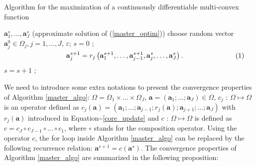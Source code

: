 \documentclass[
]{jss}
\begin{document}
\begin{algorithm}[!ht]
    \caption{Algorithm for the maximization of a continuously differentiable multi-convex function}
    \begin{algorithmic}[1]
         {$\mathbf a_1^s, \ldots,  \mathbf a_J^s$ (approximate solution of (\ref{master_optim}))}
         {choose random vector $\mathbf a_j^0\in\Omega_j, j =1, \ldots, J$, $\varepsilon$;}
        \STATE$s = 0$ ;
        \REPEAT
        \STATE \hspace{-2cm}$\vcenter{\begin{equation}
             \mathbf a_j^{s+1} = r_j\left(  \mathbf a_1^{s+1}, \ldots,  \mathbf a_{j-1}^{s+1},  \mathbf a_j^{s}, \ldots,  \mathbf a_J^{s}\right).
        \end{equation}}$
        \ENDFOR
        \STATE$s = s + 1$ ;
    \end{algorithmic}
    \label{master_algo}
\end{algorithm}

We need to introduce some extra notations to present the convergence
properties of Algorithm \ref{master_algo}:
\(\Omega = \Omega_1 \times \ldots \times \Omega_J\),
\(\mathbf a = \left( \mathbf a_1; \ldots; \mathbf a_J\right) \in \Omega\),
\(c_j \text{ : } \Omega\mapsto\Omega\) is an operator defined as
\(c_j( \mathbf a) = \left( \mathbf a_1; \ldots; \mathbf a_{j-1} ; r_j( \mathbf a) ; \mathbf a_{j+1} ; \ldots; \mathbf a_J\right)\)
with \(r_j( \mathbf a)\) introduced in
Equation\textasciitilde{}\ref{core_update} and
\(c \text{ : } \Omega\mapsto\Omega\) is defined as
\(c = c_J\circ c_{J-1}\circ ... \circ c_1\), where \(\circ\) stands for
the composition operator. Using the operator \(c\), the
\guillemotleft for loop\guillemotright{} inside Algorithm
\ref{master_algo} can be replaced by the following recurrence relation:
\(\mathbf a^{s+1} = c( \mathbf a^s)\). The convergence properties of
Algorithm \ref{master_algo} are summarized in the following proposition:
\end{document}
